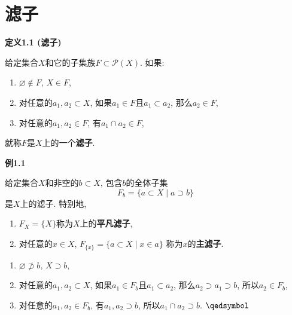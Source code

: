 \documentclass[UTF8]{ctexart}
\begin{document}
\setlength{\abovedisplayskip}{1pt}
\setlength{\belowdisplayskip}{1pt}

\section{滤子}



\hypertarget{sec:定义1.1}{}
\noindent\textbf{定义1.1 (滤子)}

给定集合$X$和它的子集族$F\subset\mathcal{P}(X)$. 如果:
\begin{enumerate}
    \item $\varnothing\notin F,\,X\in F$,
    \item 对任意的$a_1,a_2\subset X$, 如果$a_1\in F$且$a_1\subset a_2$,
    那么$a_2\in F$,
    \item 对任意的$a_1,a_2\in F$, 有$a_1\cap a_2\in F$,
\end{enumerate}
就称$F$是$X$上的一个\textbf{滤子}.




\vspace{10pt}

\hypertarget{sec:例1.1}{}
\noindent\textbf{例1.1}

给定集合$X$和非空的$b\subset X$, 包含$b$的全体子集
\[
    F_b=\{a\subset X\mid a\supset b\}
\]
是$X$上的滤子. 特别地,
\begin{enumerate}
    \item $F_X=\{X\}$称为$X$上的\textbf{平凡滤子},
    \item 对任意的$x\in X$, $F_{\{x\}}=\{a\subset X\mid x\in a\}$
    称为$x$的\textbf{主滤子}.
\end{enumerate}


\begin{enumerate}
    \item $\varnothing\not\supset b,\,X\supset b$,
    \item 对任意的$a_1,a_2\subset X$, 如果$a_1\in F_b$且$a_1\subset a_2$,
    那么$a_2\supset a_1\supset b$, 所以$a_2\in F_b$,
    \item 对任意的$a_1,a_2\in F_b$, 有$a_1,a_2\supset b$,
    所以$a_1\cap a_2\supset b$. \hfill $\qedsymbol$
\end{enumerate}
\end{document}
